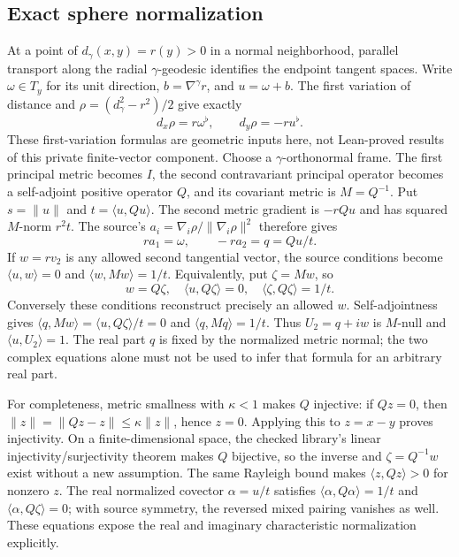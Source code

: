 \documentclass[11pt]{article}
\theoremstyle{definition}
\theoremstyle{remark}
\numberwithin{equation}{section}
\begin{document}
\subsection{Exact sphere normalization}
At a point of $d_\gamma(x,y)=r(y)>0$ in a normal neighborhood,
parallel transport along the radial $\gamma$-geodesic identifies the endpoint
tangent spaces. Write $\omega\in T_y$ for its unit direction,
$b=\nabla^\gamma r$, and $u=\omega+b$. The first variation of distance
and $\rho=(d_\gamma^2-r^2)/2$ give exactly
\[
 d_x\rho=r\omega^\flat,\qquad d_y\rho=-r u^\flat.
\]
These first-variation formulas are geometric inputs here, not Lean-proved
results of this private finite-vector component. Choose a $\gamma$-orthonormal
frame. The first principal metric becomes $I$, the second contravariant
principal operator becomes a self-adjoint positive operator $Q$, and its
covariant metric is $M=Q^{-1}$. Put $s=\|u\|$ and $t=\langle u,Qu\rangle$.
The second metric gradient is $-rQu$ and has squared $M$-norm $r^2t$.
The source's $a_i=\nabla_i\rho/\|\nabla_i\rho\|^2$ therefore gives
\[
 r a_1=\omega,\qquad -r a_2=q=Qu/t.
\]
If $w=r v_2$ is any allowed second tangential vector, the source conditions
become $\langle u,w\rangle=0$ and $\langle w,Mw\rangle=1/t$.
Equivalently, put $\zeta=Mw$, so
\[
 w=Q\zeta,\quad \langle u,Q\zeta\rangle=0,
 \quad \langle\zeta,Q\zeta\rangle=1/t.
\]
Conversely these conditions reconstruct precisely an allowed $w$.
Self-adjointness gives
$\langle q,Mw\rangle=\langle u,Q\zeta\rangle/t=0$ and
$\langle q,Mq\rangle=1/t$. Thus $U_2=q+iw$ is $M$-null and
$\langle u,U_2\rangle=1$. The real part $q$ is fixed by the normalized
metric normal; the two complex equations alone must not be used to infer
that formula for an arbitrary real part.

For completeness, metric smallness with $\kappa<1$ makes $Q$ injective:
if $Qz=0$, then $\|z\|=\|Qz-z\|\le\kappa\|z\|$, hence $z=0$.
Applying this to $z=x-y$ proves injectivity. On a finite-dimensional space,
the checked library's linear injectivity/surjectivity theorem makes $Q$
bijective, so the inverse and $\zeta=Q^{-1}w$ exist without a new assumption.
The same Rayleigh bound makes $\langle z,Qz\rangle>0$ for nonzero $z$.
The real normalized covector $\alpha=u/t$ satisfies
$\langle\alpha,Q\alpha\rangle=1/t$ and
$\langle\alpha,Q\zeta\rangle=0$; with source symmetry, the reversed mixed
pairing vanishes as well. These equations expose the real and imaginary
characteristic normalization explicitly.
\end{document}
